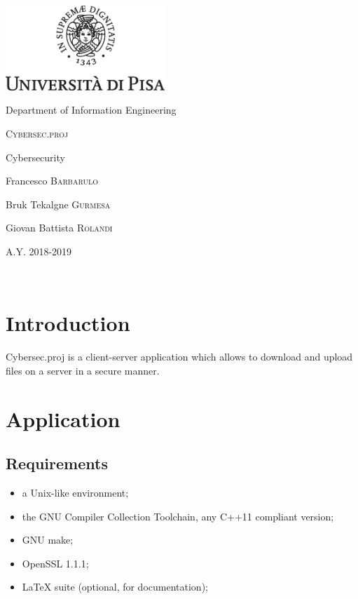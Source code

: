 \documentclass[a4paper,12pt]{article}
\newcommand{\projectname}{Cybersec.proj}
\begin{document}

{
  \begin{titlepage}
  	\centering
  	\includegraphics[width=6cm]{img/unipi.eps}\par
    \vspace{1.5cm}
    {\Large Department of Information Engineering \par}
  	\vspace{1.5cm}
  	{\huge\textsc{\projectname{}}\par}
    \vspace{1cm}
    {\Large Cybersecurity \par}
  	\vspace{2cm}
  	Francesco \textsc{Barbarulo}\par
  	Bruk Tekalgne \textsc{Gurmesa}\par
    Giovan Battista \textsc{Rolandi}

  	\vfill

  	{\large A.Y. 2018-2019\par}
  \end{titlepage}
}


\clearpage
~
\clearpage
\tableofcontents
\clearpage
~
\clearpage
{}

\section{Introduction}
\projectname{} is a client-server application which allows to download and upload files on a server in a secure manner.

\section{Application}
\subsection{Requirements}
\begin{itemize}
  \item a Unix-like environment;
  \item the GNU Compiler Collection Toolchain, any C++11 compliant version;
  \item GNU make;
  \item OpenSSL 1.1.1;
  \item LaTeX suite (optional, for documentation);
\end{itemize}
\end{document}
